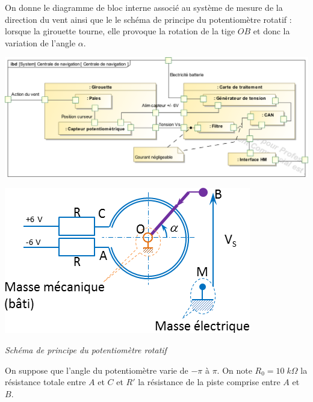 \documentclass[10pt]{article}
\begin{document}
\vspace{.25cm}

On donne le diagramme de bloc interne associé au système de mesure de la direction du vent ainsi que le le schéma de principe du potentiomètre rotatif : lorsque la girouette tourne, elle provoque la rotation de la tige $OB$ et donc la variation de l'angle $\alpha$. 

\vspace{.25cm}

\begin{minipage}[c]{.55\linewidth}
\begin{center}
\includegraphics[width=\textwidth]{images/ibd}
\end{center}
\end{minipage}\hfill
\begin{minipage}[c]{.4\linewidth}
\begin{center}
\includegraphics[width=\textwidth]{images/capteur}

\textit{Schéma de principe du potentiomètre rotatif}
\end{center}
\end{minipage} 

\vspace{.25cm}

On suppose que l'angle du potentiomètre varie de $-\pi$ à $\pi$. On note $R_0= 10 \; k\Omega$ la résistance totale entre $A$ et $C$ et $R'$ la résistance de la piste comprise entre $A$ et $B$. 
\end{document}
